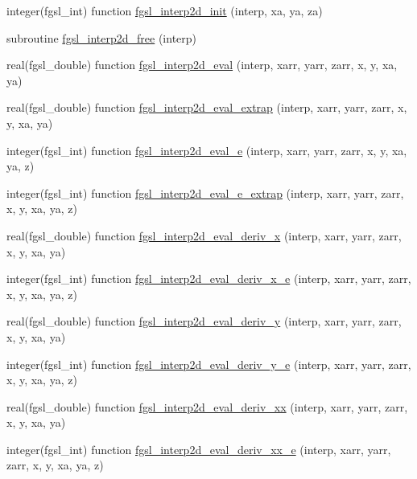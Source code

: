 \begin{DoxyCompactItemize}
\item 
integer(fgsl\+\_\+int) function \hyperlink{interp_8finc_a3639e30da7c3f0b007dde7cbaf136e58}{fgsl\+\_\+interp2d\+\_\+init} (interp, xa, ya, za)
\item 
subroutine \hyperlink{interp_8finc_a78079603157fd105824bca8b78f59910}{fgsl\+\_\+interp2d\+\_\+free} (interp)
\item 
real(fgsl\+\_\+double) function \hyperlink{interp_8finc_a34c1647e962f7141c0c22aaf282142f6}{fgsl\+\_\+interp2d\+\_\+eval} (interp, xarr, yarr, zarr, x, y, xa, ya)
\item 
real(fgsl\+\_\+double) function \hyperlink{interp_8finc_abeb2449021c0fd821fa56a8f71ad347c}{fgsl\+\_\+interp2d\+\_\+eval\+\_\+extrap} (interp, xarr, yarr, zarr, x, y, xa, ya)
\item 
integer(fgsl\+\_\+int) function \hyperlink{interp_8finc_a2369e6686d8d5589722f50a1a14e0165}{fgsl\+\_\+interp2d\+\_\+eval\+\_\+e} (interp, xarr, yarr, zarr, x, y, xa, ya, z)
\item 
integer(fgsl\+\_\+int) function \hyperlink{interp_8finc_a22a62d1db14b735f1c1047a77773fa5a}{fgsl\+\_\+interp2d\+\_\+eval\+\_\+e\+\_\+extrap} (interp, xarr, yarr, zarr, x, y, xa, ya, z)
\item 
real(fgsl\+\_\+double) function \hyperlink{interp_8finc_ab790b05464d6e07bc268fb50efbc15ca}{fgsl\+\_\+interp2d\+\_\+eval\+\_\+deriv\+\_\+x} (interp, xarr, yarr, zarr, x, y, xa, ya)
\item 
integer(fgsl\+\_\+int) function \hyperlink{interp_8finc_ad562fc4bbdb63ed754f2eed92b68b241}{fgsl\+\_\+interp2d\+\_\+eval\+\_\+deriv\+\_\+x\+\_\+e} (interp, xarr, yarr, zarr, x, y, xa, ya, z)
\item 
real(fgsl\+\_\+double) function \hyperlink{interp_8finc_aeeb6c2f040d033e2e269f66793526d2d}{fgsl\+\_\+interp2d\+\_\+eval\+\_\+deriv\+\_\+y} (interp, xarr, yarr, zarr, x, y, xa, ya)
\item 
integer(fgsl\+\_\+int) function \hyperlink{interp_8finc_a289ed00a77413ae418445b07c871cf0c}{fgsl\+\_\+interp2d\+\_\+eval\+\_\+deriv\+\_\+y\+\_\+e} (interp, xarr, yarr, zarr, x, y, xa, ya, z)
\item 
real(fgsl\+\_\+double) function \hyperlink{interp_8finc_ad29fd59e7f886dc193d10ecb40286ca7}{fgsl\+\_\+interp2d\+\_\+eval\+\_\+deriv\+\_\+xx} (interp, xarr, yarr, zarr, x, y, xa, ya)
\item 
integer(fgsl\+\_\+int) function \hyperlink{interp_8finc_ae6297b14679b84b5fa6b1a2d3dca601c}{fgsl\+\_\+interp2d\+\_\+eval\+\_\+deriv\+\_\+xx\+\_\+e} (interp, xarr, yarr, zarr, x, y, xa, ya, z)

\end{DoxyCompactItemize}
